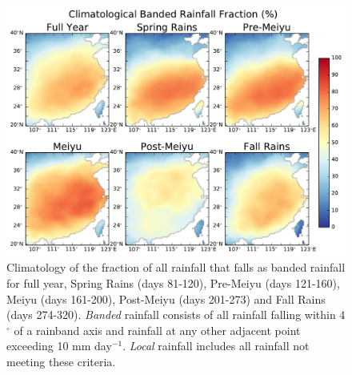 \documentclass[singlecolumn,11pt]{pnas-new}
\begin{document}
\begin{figure}[htb]
\centering
\noindent\includegraphics[width=38pc]{Figures/banded_frac_climo}
\caption{Climatology of the fraction of all rainfall that falls as banded rainfall for full year, Spring Rains (days 81-120), Pre-Meiyu (days 121-160), Meiyu (days 161-200), Post-Meiyu (days 201-273) and Fall Rains (days 274-320). \textit{Banded} rainfall consists of all rainfall falling within 4$^{\circ}$ of a rainband axis and rainfall at any other adjacent point exceeding 10 mm day$^{-1}$. \textit{Local} rainfall includes all rainfall not meeting these criteria.}
\label{fig:banded_frac_climo}
\end{figure}
\end{document}
